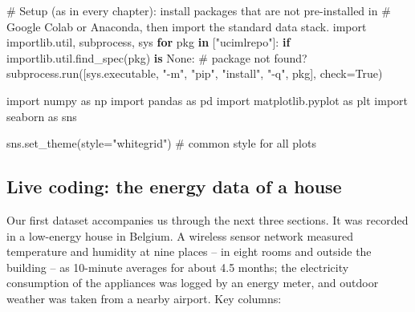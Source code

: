 \documentclass[
  letterpaper,
  DIV=11,
  numbers=noendperiod]{scrreprt}
\newenvironment{Shaded}{\begin{snugshade}}{\end{snugshade}}
\newcommand{\CommentTok}[1]{\textcolor[rgb]{0.37,0.37,0.37}{#1}}
\newcommand{\ControlFlowTok}[1]{\textcolor[rgb]{0.00,0.23,0.31}{\textbf{#1}}}
\newcommand{\ImportTok}[1]{\textcolor[rgb]{0.00,0.46,0.62}{#1}}
\newcommand{\KeywordTok}[1]{\textcolor[rgb]{0.00,0.23,0.31}{\textbf{#1}}}
\newcommand{\NormalTok}[1]{\textcolor[rgb]{0.00,0.23,0.31}{#1}}
\newcommand{\OperatorTok}[1]{\textcolor[rgb]{0.37,0.37,0.37}{#1}}
\newcommand{\StringTok}[1]{\textcolor[rgb]{0.13,0.47,0.30}{#1}}
\newcommand{\VariableTok}[1]{\textcolor[rgb]{0.07,0.07,0.07}{#1}}
\begin{document}
\begin{Shaded}
\begin{Highlighting}[]
\CommentTok{\# Setup (as in every chapter): install packages that are not pre{-}installed in}
\CommentTok{\# Google Colab or Anaconda, then import the standard data stack.}
\ImportTok{import}\NormalTok{ importlib.util, subprocess, sys}
\ControlFlowTok{for}\NormalTok{ pkg }\KeywordTok{in}\NormalTok{ [}\StringTok{"ucimlrepo"}\NormalTok{]:}
    \ControlFlowTok{if}\NormalTok{ importlib.util.find\_spec(pkg) }\KeywordTok{is} \VariableTok{None}\NormalTok{:        }\CommentTok{\# package not found?}
\NormalTok{        subprocess.run([sys.executable, }\StringTok{"{-}m"}\NormalTok{, }\StringTok{"pip"}\NormalTok{, }\StringTok{"install"}\NormalTok{, }\StringTok{"{-}q"}\NormalTok{, pkg], check}\OperatorTok{=}\VariableTok{True}\NormalTok{)}

\ImportTok{import}\NormalTok{ numpy }\ImportTok{as}\NormalTok{ np}
\ImportTok{import}\NormalTok{ pandas }\ImportTok{as}\NormalTok{ pd}
\ImportTok{import}\NormalTok{ matplotlib.pyplot }\ImportTok{as}\NormalTok{ plt}
\ImportTok{import}\NormalTok{ seaborn }\ImportTok{as}\NormalTok{ sns}

\NormalTok{sns.set\_theme(style}\OperatorTok{=}\StringTok{"whitegrid"}\NormalTok{)                     }\CommentTok{\# common style for all plots}
\end{Highlighting}
\end{Shaded}

\subsection{Live coding: the energy data of a
house}\label{live-coding-the-energy-data-of-a-house}

Our first dataset accompanies us through the next three sections. It was
recorded in a low-energy house in Belgium. A wireless sensor network
measured temperature and humidity at nine places -- in eight rooms and
outside the building -- as 10-minute averages for about 4.5 months; the
electricity consumption of the appliances was logged by an energy meter,
and outdoor weather was taken from a nearby airport. Key columns:
\end{document}
